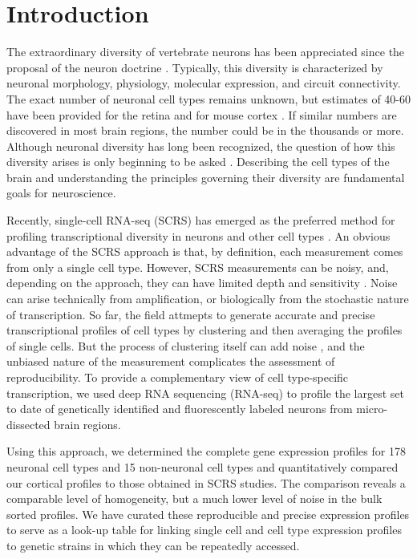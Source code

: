\section*{Introduction}

The extraordinary diversity of vertebrate neurons has been appreciated since the proposal of the neuron doctrine \cite{0195074017}. Typically, this diversity is characterized by neuronal morphology, physiology, molecular expression, and circuit connectivity. The exact number of neuronal cell types remains unknown, but estimates of 40-60 have been provided for the retina \cite{Macosko_2015,Masland_2004} and for mouse cortex \cite{Tasic_2016,Zeisel_2015}. If similar numbers are discovered in most brain regions, the number could be in the thousands or more. Although neuronal diversity has long been recognized, the question of how this diversity arises is only beginning to be asked \cite{Arendt_2008,Muotri_2006}. Describing the cell types of the brain and understanding the principles governing their diversity are fundamental goals for neuroscience.

Recently, single-cell RNA-seq (SCRS) has emerged as the preferred method for profiling transcriptional diversity in neurons and other cell types \cite{Shapiro_2013}. An obvious advantage of the SCRS approach is that, by definition, each measurement comes from only a single cell type. However, SCRS measurements can be noisy, and, depending on the approach, they can have limited depth and sensitivity \cite{Parekh_2016,Svensson_2017}. Noise can arise technically from amplification, or biologically from the stochastic nature of transcription. So far, the field attmepts to generate accurate and precise transcriptional profiles of cell types by clustering and then averaging the profiles of single cells. But the process of clustering itself can add noise \cite{Ntranos_2016}, and the unbiased nature of the measurement complicates the assessment of reproducibility. To provide a complementary view of cell type-specific transcription, we used deep RNA sequencing (RNA-seq) to profile the largest set to date of genetically identified and  fluorescently labeled neurons from micro-dissected brain regions.  

Using this approach, we determined the complete gene expression profiles for 178 neuronal cell types and 15 non-neuronal cell types and quantitatively compared our cortical profiles to those obtained in SCRS studies. The comparison reveals a comparable level of homogeneity, but a much lower level of noise in the bulk sorted profiles. We have curated these reproducible and precise expression profiles to serve as a look-up table for linking single cell and cell type expression profiles to genetic strains in which they can be repeatedly accessed. 

